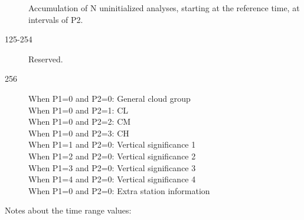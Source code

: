 \documentclass[draft,12pt,a4paper,twoside]{book}
\begin{document}
\begin{description}
  Accumulation of N uninitialized analyses, starting at the reference time, at
  intervals of P2.
\item [125-254] Reserved.
\item [256]
  When P1=0 and P2=0: General cloud group \\
  When P1=0 and P2=1: CL \\
  When P1=0 and P2=2: CM \\
  When P1=0 and P2=3: CH \\
  When P1=1 and P2=0: Vertical significance 1 \\
  When P1=2 and P2=0: Vertical significance 2 \\
  When P1=3 and P2=0: Vertical significance 3 \\
  When P1=4 and P2=0: Vertical significance 4 \\
  When P1=0 and P2=0: Extra station information
\end{description}

Notes about the time range values:
\end{document}
